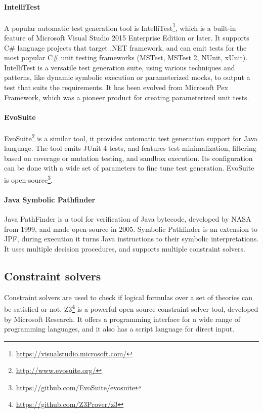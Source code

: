 \paragraph{IntelliTest}
A popular automatic test generation tool is IntelliTest\footnote{\url{https://visualstudio.microsoft.com/}}, which is a built-in feature of Microsoft Visual Studio 2015 Enterprise Edition or later. It supports C\# language projects that target .NET framework, and can emit tests for the most popular C\# unit testing frameworks (MSTest, MSTest 2, NUnit, xUnit). IntelliTest is a versatile test generation suite, using various techniques and patterns, like dynamic symbolic execution or parameterized mocks, to output a test that suits the requirements. It has been evolved from Microsoft Pex Framework, which was a pioneer product for creating parameterized unit tests.  \cite{advances-in-unit-testing-theory-and-practice, intellitest_manual}
\paragraph{EvoSuite}
EvoSuite\footnote{\url{http://www.evosuite.org/}} is a similar tool, it provides automatic test generation support for Java language. The tool emits JUnit 4 tests, and features test minimalization, filtering based on coverage or mutation testing, and sandbox execution. Its configuration can be done with a wide set of parameters to fine tune test generation. EvoSuite is open-source\footnote{\url{https://github.com/EvoSuite/evosuite}}. \cite{aron_autom}
\paragraph{Java Symbolic Pathfinder}
Java PathFinder is a tool for verification of Java bytecode, developed by NASA from 1999, and made open-source in 2005. Symbolic Pathfinder is an extension to JPF, during execution it turns Java instructions to their symbolic interpretations. It uses multiple decision procedures, and supports multiple constraint solvers.
\cite{Pasareanu2013SymbolicPI}
\subsection{Constraint solvers}
Constraint solvers are used to check if logical formulas over a set of theories can be satisfied or not. Z3\footnote{\url{https://github.com/Z3Prover/z3}} is a powerful open source constraint solver tool, developed by Microsoft Research. It offers a programming interface for a wide range of programming languages, and it also has a script language for direct input.

